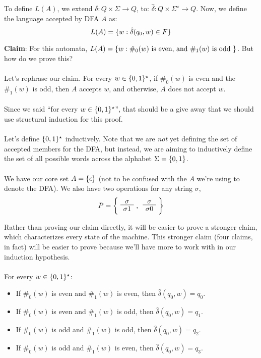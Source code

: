 \documentclass[]{article}
\DeclarePairedDelimiter{\set}{\lbrace}{\rbrace}
\theoremstyle{definition}
\begin{document}
      To define $L(A)$, we extend $\delta: Q \times \Sigma \to Q$, to: $\hat{\delta}: Q \times \Sigma^\star \to Q$. Now, we define the language accepted by DFA $A$ as:
      $$
        L(A) = \set{ w : \hat{\delta}(q_0, w) \in F }
      $$

      \textbf{Claim}: For this automata, $L(A) = \set{ w : \#_0(w) \text{ is even, and } \#_1(w) \text{ is odd }}$. But how do we prove this?
      \\ \\
      Let's rephrase our claim. For every $w \in \set{0, 1}^\star$, if $\#_0(w)$ is even and the $\#_1(w)$ is odd, then $A$ accepts $w$, and otherwise, $A$ does not accept $w$.
      \\ \\
      Since we said ``for every $w \in \set{0, 1}^\star$'', that should be a give away that we should use structural induction for this proof.
      \\ \\
      Let's define $\set{0, 1}^\star$ inductively. Note that we are \emph{not} yet defining the set of accepted members for the DFA, but instead, we are aiming to inductively define the set of all possible words across the alphabet $\Sigma = \set{0, 1}$.
      \\ \\
      We have our core set $A = \set{ \epsilon }$ (not to be confused with the $A$ we're using to denote the DFA). We also have two operations for any string $\sigma$,
      $$
        P = \bigg\{ \text{\AxiomC{$\sigma$} \UnaryInfC{$\sigma 1$} \DisplayProof, \AxiomC{$\sigma$} \UnaryInfC{$\sigma 0$} \DisplayProof} \bigg\}
      $$

      Rather than proving our claim directly, it will be easier to prove a stronger claim, which characterizes every state of the machine. This stronger claim (four claims, in fact) will be easier to prove because we'll have more to work with in our induction hypothesis.
      \\ \\
      For every $w \in \set{0, 1}^\star$:

      \begin{itemize}
        \item If $\#_0(w)$ is even and $\#_1(w)$ is even, then $\hat{\delta}(q_0, w) = q_0$.
        \item If $\#_0(w)$ is even and $\#_1(w)$ is odd, then $\hat{\delta}(q_0, w) = q_1$.
        \item If $\#_0(w)$ is odd and $\#_1(w)$ is odd, then $\hat{\delta}(q_0, w) = q_2$.
        \item If $\#_0(w)$ is odd and $\#_1(w)$ is even, then $\hat{\delta}(q_0, w) = q_3$.
      \end{itemize}
\end{document}
